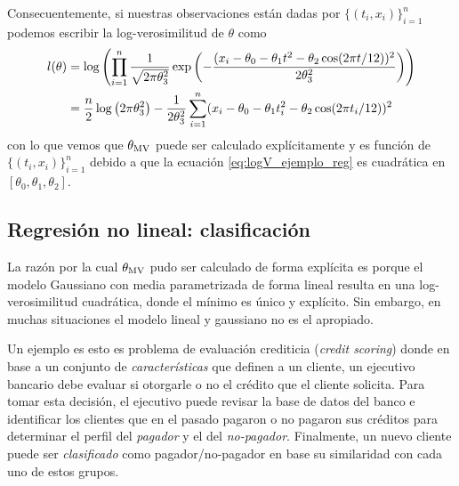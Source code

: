 Consecuentemente, si nuestras observaciones están dadas por $\{(t_i,x_i)\}_{i=1}^n$ podemos escribir la log-verosimilitud de $\theta$ como 
\begin{align}
	\label{eq:logV_ejemplo_reg}
	l(\theta) 	&=\log\left(\prod_{i=1}^n \frac{1}{\sqrt{2\pi\theta_3^2}}\exp\left(-\frac{(x_i-\theta_0 - \theta_1 t^2 - \theta_2\cos(2\pi t/12))^2}{2\theta_3^2}\right)\right)\nonumber \\
	&=\frac{n}{2}\log\left(2\pi\theta_3^2\right)  - \frac{1}{2\theta_3^2}\sum_{i=1}^n (x_i - \theta_0 - \theta_1 t_i^2 - \theta_2\cos(2\pi t_i/12))^2
\end{align}
con lo que vemos que ${\theta_\text{MV}}$ puede ser calculado explícitamente y es función de $\{(t_i,x_i)\}_{i=1}^n$ debido a que la ecuación \eqref{eq:logV_ejemplo_reg} es cuadrática en $[\theta_0,\theta_1,	\theta_2]$.



\subsection{Regresión no lineal: clasificación} 
\label{sub:clasif}

La razón por la cual ${\theta_\text{MV}}$ pudo ser calculado de forma explícita es porque el modelo Gaussiano con media parametrizada de forma lineal resulta en una log-verosimilitud cuadrática, donde el mínimo es único y explícito. Sin embargo, en muchas situaciones el modelo lineal y gaussiano no es el apropiado. 

Un ejemplo es esto es problema de evaluación crediticia (\textit{credit scoring}) donde en base a un conjunto de \textit{características} que definen a un cliente, un ejecutivo bancario debe evaluar si otorgarle o no el crédito que el cliente solicita. Para tomar esta decisión, el ejecutivo puede revisar la base de datos del banco e identificar los clientes que en el pasado pagaron o no pagaron sus créditos para determinar el perfil del \textit{pagador} y el del \textit{no-pagador}. Finalmente, un nuevo cliente puede ser \textit{clasificado} como pagador/no-pagador en base su similaridad con cada uno de estos grupos. 

